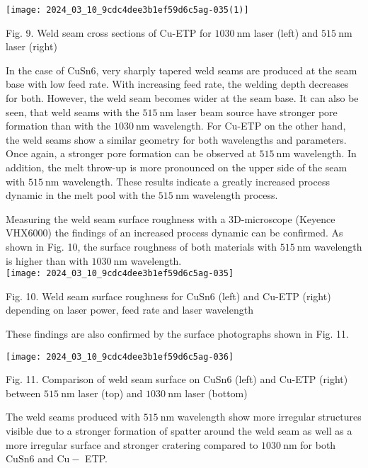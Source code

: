 \documentclass[10pt]{article}
\begin{document}
\begin{center}
\texttt{[image: 2024\_03\_10\_9cdc4dee3b1ef59d6c5ag-035(1)]}
\end{center}

Fig. 9. Weld seam cross sections of Cu-ETP for $1030 \mathrm{~nm}$ laser (left) and $515 \mathrm{~nm}$ laser (right)

In the case of CuSn6, very sharply tapered weld seams are produced at the seam base with low feed rate. With increasing feed rate, the welding depth decreases for both. However, the weld seam becomes wider at the seam base. It can also be seen, that weld seams with the $515 \mathrm{~nm}$ laser beam source have stronger pore formation than with the $1030 \mathrm{~nm}$ wavelength. For $\mathrm{Cu}$-ETP on the other hand, the weld seams show a similar geometry for both wavelengths and parameters. Once again, a stronger pore formation can be observed at $515 \mathrm{~nm}$ wavelength. In addition, the melt throw-up is more pronounced on the upper side of the seam with $515 \mathrm{~nm}$ wavelength. These results indicate a greatly increased process dynamic in the melt pool with the $515 \mathrm{~nm}$ wavelength process.

Measuring the weld seam surface roughness with a 3D-microscope (Keyence VHX6000) the findings of an increased process dynamic can be confirmed. As shown in Fig. 10, the surface roughness of both materials with $515 \mathrm{~nm}$ wavelength is higher than with $1030 \mathrm{~nm}$ wavelength.\\
\texttt{[image: 2024\_03\_10\_9cdc4dee3b1ef59d6c5ag-035]}

Fig. 10. Weld seam surface roughness for CuSn6 (left) and Cu-ETP (right) depending on laser power, feed rate and laser wavelength

These findings are also confirmed by the surface photographs shown in Fig. 11.

\begin{center}
\texttt{[image: 2024\_03\_10\_9cdc4dee3b1ef59d6c5ag-036]}
\end{center}

Fig. 11. Comparison of weld seam surface on CuSn6 (left) and Cu-ETP (right) between $515 \mathrm{~nm}$ laser (top) and $1030 \mathrm{~nm}$ laser (bottom)

The weld seams produced with $515 \mathrm{~nm}$ wavelength show more irregular structures visible due to a stronger formation of spatter around the weld seam as well as a more irregular surface and stronger cratering compared to $1030 \mathrm{~nm}$ for both $\mathrm{CuSn} 6$ and $\mathrm{Cu}-$ ETP.
\end{document}
